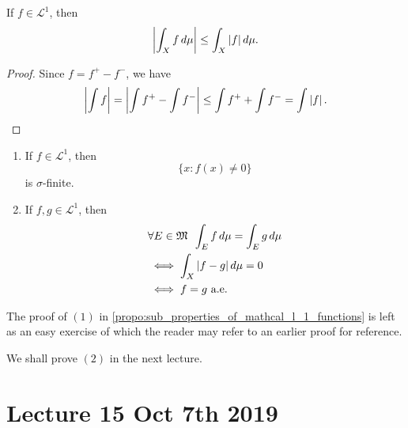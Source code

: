 \documentclass[notoc,notitlepage]{tufte-book}
\begin{document}
\begin{propo}\label{propo:absolute_value_of_integral_is_lesser_than_integral_of_absolute_value}
  If $f \in \mathcal{L}^1$, then
  \begin{equation*}
    \left| \int_{X} f \mathop{}\!d{\mu} \right| \leq \int_{X} \left|f\right| \mathop{}\!d{\mu}.
  \end{equation*}
\end{propo}

\begin{proof}
  Since $f = f^+ - f^-$, we have
  \begin{equation*}
    \left| \int f \right|
    = \left| \int f^+ - \int f^- \right|
    \leq \int f^+ + \int f^- = \int \left|f\right|.
  \end{equation*}
\end{proof}

\begin{propo}\label{propo:sub_properties_of_mathcal_l_1_functions}
  \begin{enumerate}
    \item If $f \in \mathcal{L}^1$, then
      \begin{equation*}
        \{ x : f(x) \neq 0 \}
      \end{equation*}
      is $\sigma$-finite.
    \item If $f, g \in \mathcal{L}^1$, then
      \begin{align*}
        &\forall E \in \mathfrak{M}\enspace
        \int_{E} f \mathop{}\!d{\mu} = \int_{E} g \mathop{}\!d{\mu} \\
        &\iff \int_X \left|f - g\right| \mathop{}\!d{\mu} = 0 \\
        &\iff f = g \text{ a.e. }
      \end{align*}
  \end{enumerate}
\end{propo}

\begin{ex}
  The proof of $(1)$ in \cref{propo:sub_properties_of_mathcal_l_1_functions}
  is left as an easy exercise of which the reader may refer to
  an earlier proof for reference.
\end{ex}

We shall prove $(2)$ in the next lecture.



\chapter{Lecture 15 Oct 7th 2019}%
\label{chp:lecture_15_oct_7th_2019}
\end{document}
